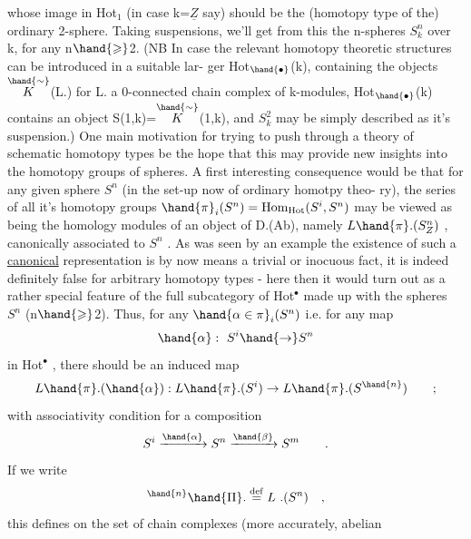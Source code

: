 
 whose image in Hot$_1$ (in case k=$\underline{Z}$ say) should be the (homotopy type
of the) ordinary 2-sphere. Taking suspensions, we'll get from this
the n-spheres $S^n_k$ over k, for any n$\hand{\geqslant}$2. (NB In case the relevant
homotopy theoretic structures can be introduced in  a suitable lar-%
ger Hot$_{\hand{\bullet}}$(k), containing the objects $\overset{\hand{\sim}}{K}$(L.) for L.  a 0-connected
chain complex of k-modules, Hot$_{\hand{\bullet}}$(k) contains an object S(1,k)=$\overset{\hand{\sim}}{K}$(1,k),
and $S^2_k$ may be simply described as it's suspension.) One main motivation
for trying to push through a theory of schematic homotopy types  be
 the hope that this may provide new insights into the homotopy
groups of spheres. A first interesting consequence would be
that for any given sphere $S^n$ (in the set-up now of ordinary homotpy theo-%
ry), the series of all it's homotopy groups $\hand{\pi}_i(S^n) = \mathrm{Hom}_{\mathrm{Hot}}(S^i,S^n)$
may be viewed as being the homology modules of an object of D.(Ab),
namely $L\hand{\pi}.(S^n_{Z})$ , canonically associated to $S^n$ . As was seen by an
example\deleted{,} the existence of such a \uline{canonical} representation is by now
means a trivial or inocuous fact, it is indeed  definitely
false for arbitrary homotopy types - here then it would turn out as a
rather special feature of the full subcategory of Hot$^\bullet$ made up with
the spheres $S^n$ (n$\hand{\geqslant}$2). Thus, for any $\hand{\alpha\in\pi}_i(S^n)$ i.e. for any map
\[\hand{\alpha} :\ S^i \hand{\to} S^n\]
in Hot$^\bullet$ , there should be an induced map
\[L\hand{\pi}.(\hand{\alpha}) : L\hand{\pi}.(S^i) \to L\hand{\pi}.(S^{\hand{n}}) \qquad ;\]
with associativity condition for a composition
\[S^i \xrightarrow{\hand{\alpha}} S^n \xrightarrow{\hand{\beta}} S^m \qquad .\]
If we write
\[{}^{\hand{n}}\hand{\Pi}. \overset{\mathrm{def}}{=} L\ .(S^n) \quad ,\]
this defines on the set of chain complexes (more accurately, abelian
